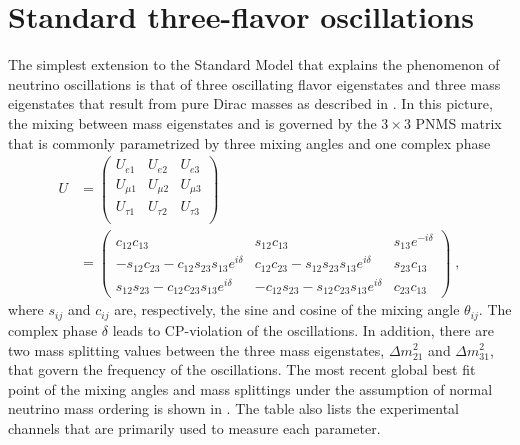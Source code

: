 \section{Standard three-flavor oscillations}
The simplest extension to the Standard Model that explains the phenomenon of neutrino oscillations is that of three oscillating flavor eigenstates and three mass eigenstates that result from pure Dirac masses as described in . In this picture, the mixing between mass eigenstates and is governed by the $3\times3$ PNMS matrix that is commonly parametrized by three mixing angles and one complex phase
\begin{equation}
\begin{aligned}
    U &=
    \begin{pmatrix}
    U_{e1}    & U_{e2}    & U_{e3}    \\
    U_{\mu1}  & U_{\mu2}  & U_{\mu3}  \\
    U_{\tau1} & U_{\tau2} & U_{\tau3} \\
    \end{pmatrix} \\
    &=
    \begin{pmatrix}
        c_{12} c_{13} & s_{12} c_{13} & s_{13}e^{-i\delta}       \\
        -s_{12}c_{23} - c_{12}s_{23}s_{13}e^{i\delta} & c_{12}c_{23}-s_{12}s_{23}s_{13}e^{i\delta} & s_{23}c_{13} \\
        s_{12}s_{23}-c_{12}c_{23}s_{13}e^{i\delta} & -c_{12}s_{23}-s_{12}c_{23}s_{13}e^{i\delta} & c_{23}c_{13}
    \end{pmatrix}\;,
\end{aligned}\label{eq:pnms-parametrization}
\end{equation}
where $s_{ij}$ and $c_{ij}$ are, respectively, the sine and cosine of the mixing angle $\theta_{ij}$. The complex phase $\delta$ leads to CP-violation of the oscillations. In addition, there are two mass splitting values between the three mass eigenstates, $\Delta m^2_{21}$ and $\Delta m^2_{31}$, that govern the frequency of the oscillations.
The most recent global best fit point\cite{Esteban:2020cvm} of the mixing angles and mass splittings under the assumption of normal neutrino mass ordering is shown in . The table also lists the experimental channels that are primarily used to measure each parameter.
